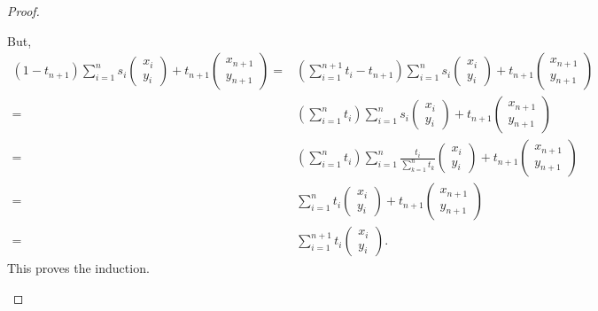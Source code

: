 \begin{proof}
\begin{enumerate}
        But,
        \begin{align*}
            (1 - t_{n+1})\sum_{i=1}^n s_i 
            \left(\begin{array}{c} 
                x_i\\ 
                y_i\end{array}\right) 
            + t_{n+1}
            \left(\begin{array}{c} 
                x_{n+1}\\ 
                y_{n+1}\end{array}\right)
            =& \left(\sum_{i=1}^{n+1} t_i - t_{n+1}\right)\sum_{i=1}^n s_i 
            \left(\begin{array}{c} 
                x_i\\ 
                y_i\end{array}\right) 
            + t_{n+1}
            \left(\begin{array}{c} 
                x_{n+1}\\ 
                y_{n+1}\end{array}\right)\\
            =& \left(\sum_{i=1}^n t_i\right)\sum_{i=1}^n s_i 
            \left(\begin{array}{c} 
                x_i\\ 
                y_i\end{array}\right) 
            + t_{n+1}
            \left(\begin{array}{c} 
                x_{n+1}\\ 
                y_{n+1}\end{array}\right)\\
            =& \left(\sum_{i=1}^n t_i\right)\sum_{i=1}^n \frac{t_i}{\sum_{k=1}^n t_k} \left(\begin{array}{c} 
                x_i\\ 
                y_i\end{array}\right) 
            + t_{n+1}
            \left(\begin{array}{c} 
                x_{n+1}\\ 
                y_{n+1}\end{array}\right)\\
            =& \sum_{i=1}^n t_i 
            \left(\begin{array}{c} 
                x_i\\ 
                y_i\end{array}\right) 
            + t_{n+1}
            \left(\begin{array}{c} 
                x_{n+1}\\ 
                y_{n+1}\end{array}\right)\\
            =& \sum_{i=1}^{n+1} t_i 
            \left(\begin{array}{c} 
                x_i\\ 
                y_i\end{array}\right).
        \end{align*}
        This proves the induction.
    \end{enumerate}
\end{proof}

